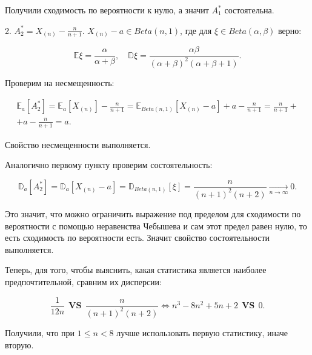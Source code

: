 \documentclass[14pt]{extarticle}
\begin{document}
Получили сходимость по вероятности к нулю, а значит $A_1^*$ состоятельна.

2. $A_2^* = X_{(n)} - \frac{n}{n+1}$. $X_{(n)} - a\in Beta(n, 1)$, где для $\xi\in Beta(\alpha, \beta)$ верно:

\begin{equation*}
    \mathbb E \xi = \frac{\alpha}{\alpha + \beta},\quad \mathbb D\xi = \frac{\alpha\beta}{(\alpha + \beta)^2(\alpha + \beta + 1)}.
\end{equation*}

Проверим на несмещенность:

\begin{gather*}
    \mathbb E_a[A_2^*] = \mathbb E_a[X_{(n)}] - \frac{n}{n+1} = \mathbb E_{Beta(n, 1)}[X_{(n)} - a] + a - \frac{n}{n+1} = \frac{n}{n+1} +\\
    + a - \frac{n}{n+1} = a.
\end{gather*}

Свойство несмещенности выполняется.

Аналогично первому пункту проверим состоятельность:

\begin{equation*}
    \mathbb D_a[A_2^*] = \mathbb D_a[X_{(n)} - a] = \mathbb D_{Beta(n, 1)}[\xi] = \frac{n}{(n+1)^2(n+2)}\underset{n\rightarrow\infty}{\longrightarrow}0.
\end{equation*}

Это значит, что можно ограничить выражение под пределом для сходимости по вероятности с помощью неравенства Чебышева и сам этот предел равен нулю, то есть сходимость по вероятности есть. Значит свойство состоятельности выполняется.

Теперь, для того, чтобы выяснить, какая статистика является наиболее предпочтительной, сравним их дисперсии:

\begin{equation*}
    \frac{1}{12n}~~ \textbf{VS}~~ \frac{n}{(n+1)^2(n+2)} \Leftrightarrow n^3 - 8n^2 + 5n + 2 ~~\textbf{VS}~~ 0.
\end{equation*}

Получили, что при $1\leqslant n < 8$ лучше использовать первую статистику, иначе вторую.
\end{document}

